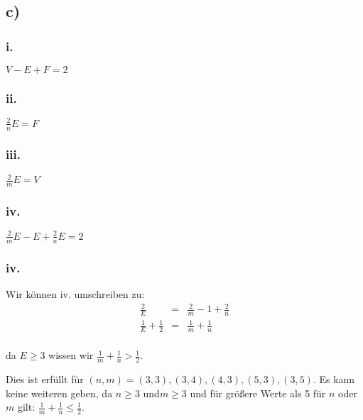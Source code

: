 \subsection*{c)}
\subsubsection*{i.}
$V-E+F = 2 $
\subsubsection*{ii.}
$\frac{2}{n}E=F$
\subsubsection*{iii.}
$\frac{2}{m}E=V$
\subsubsection*{iv.}
$\frac{2}{m}E - E +\frac{2}{n}E =2$
\subsubsection*{iv.}
Wir können iv. umschreiben zu:
\begin{eqnarray}
    \frac{2}{E} &=& \frac{2}{m} - 1 + \frac{2}{n} \\
    \frac{1}{E} + \frac{1}{2} &=& \frac{1}{m}+ \frac{1}{n} \\
\end{eqnarray}

da $E \geq 3$ wissen wir $\frac{1}{m}+ \frac{1}{n} > \frac{1}{2}$.

Dies ist erfüllt für $(n,m) = {(3,3), (3,4), (4,3), (5,3), (3,5)}$. Es kann keine weiteren geben, da $n \geq 3$ und$m \geq 3$ und für größere Werte als 5 für $n$ oder $m$ gilt: $\frac{1}{m}+ \frac{1}{n} \leq \frac{1}{2}$.





















